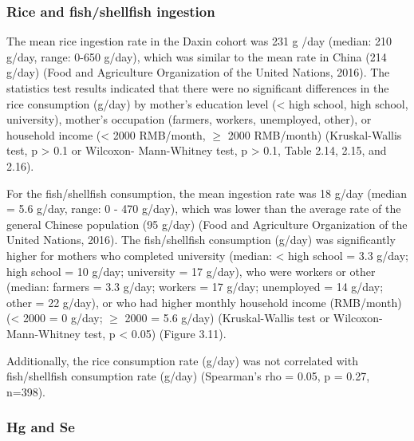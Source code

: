 \subsubsection{Rice and fish/shellfish ingestion}

The mean rice ingestion rate in the Daxin cohort was 231 g /day (median: 210 g/day, range: 0-650 g/day), which was similar to the mean rate in China (214 g/day) (Food and Agriculture Organization of the United Nations, 2016). The statistics test results indicated that there were no significant differences in the rice consumption (g/day) by mother's education level (< high school, high school, university), mother's occupation (farmers, workers, unemployed, other), or household income (< 2000 RMB/month, ${\ge}$ 2000 RMB/month) (Kruskal-Wallis test, p > 0.1 or Wilcoxon- Mann-Whitney test, p > 0.1, Table 2.14, 2.15, and 2.16).

For the fish/shellfish consumption, the mean ingestion rate was 18 g/day (median = 5.6 g/day, range: 0 - 470 g/day), which was lower than the average rate of the general Chinese population (95 g/day) (Food and Agriculture Organization of the United Nations, 2016). The fish/shellfish consumption (g/day) was significantly higher for mothers who completed university (median: < high school = 3.3 g/day; high school = 10 g/day; university = 17 g/day), who were workers or other (median: farmers = 3.3 g/day; workers = 17 g/day; unemployed = 14 g/day; other = 22 g/day), or who had higher monthly household income (RMB/month) (< 2000 = 0 g/day; ${\ge}$ 2000 = 5.6 g/day) (Kruskal-Wallis test or Wilcoxon-Mann-Whitney test, p < 0.05) (Figure 3.11).

Additionally, the rice consumption rate (g/day) was not correlated with fish/shellfish consumption rate (g/day) (Spearman's rho = 0.05, p = 0.27, n=398).

\subsubsection{Hg and Se}


